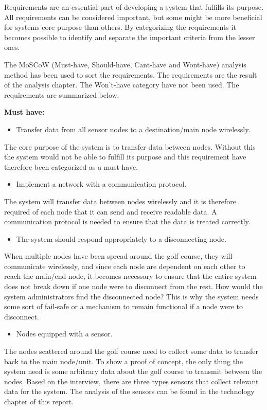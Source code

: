 Requirements are an essential part of developing a system that fulfills its purpose. All requirements can be considered important, but some might be more beneficial for systems core purpose than others. By categorizing the requirements it becomes possible to identify and separate the important criteria from the lesser ones. 

The MoSCoW (Must-have, Should-have, Cant-have and Wont-have) analysis method has been used to sort the requirements. The requirements are the result of the analysis chapter. The Won't-have category have not been used. The requirements are summarized below:

\textbf{Must have:}
\begin{itemize}
\item Transfer data from all sensor nodes to a destination/main node wirelessly.
\end{itemize}
The core purpose of the system is to transfer data between nodes. Without this the system would not be able to fulfill its purpose and this requirement have therefore been categorized as a must have.


\begin{itemize}
\item Implement a network with a communication protocol.
\end{itemize}
The system will transfer data between nodes wirelessly and it is therefore required of each node that it can send and receive readable data. A communication protocol is needed to ensure that the data is treated correctly.


\begin{itemize}
\item The system should respond appropriately to a disconnecting node.
\end{itemize}
When multiple nodes have been spread around the golf course, they will communicate wirelessly, and since each node are dependent on each other to reach the main/end node, it becomes necessary to ensure that the entire system does not break down if one node were to disconnect from the rest. How would the system administrators find the disconnected node? This is why the system needs some sort of fail-safe or a mechanism to remain functional if a node were to disconnect.


\begin{itemize}
\item Nodes equipped with a sensor.
\end{itemize}
The nodes scattered around the golf course need to collect some data to transfer back to the main node/unit. To show a proof of concept, the only thing the system need is some arbitrary data about the golf course to transmit between the nodes. Based on the interview, there are three types sensors that collect relevant data for the system. The analysis of the sensors can be found in the technology chapter of this report.


